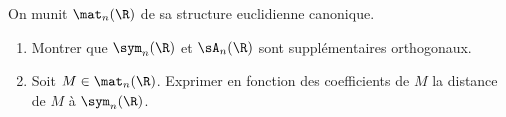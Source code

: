 \begin{enonce}
\begin{exercise}[ID={RMS135 E1433},subtitle={IMT MP 2024},tags={},difficulty={}]

On munit $\mat_n(\R)$ de sa structure euclidienne canonique.
\begin{enumerate}
  \item Montrer que $\sym_n(\R)$ et $\sA_n(\R)$ sont supplémentaires orthogonaux.
  \item Soit $M \in \mat_n(\R)$. Exprimer en fonction des coefficients de $M$ la distance de $M$ à $\sym_n(\R)$.
\end{enumerate}

\end{exercise}
\begin{solution}
\end{solution}
\end{enonce}
